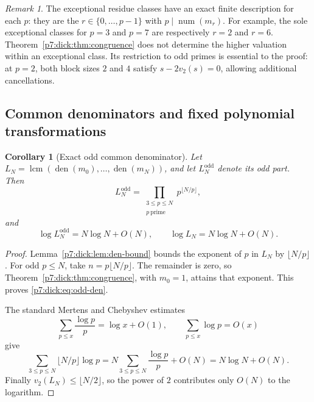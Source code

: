 \documentclass[11pt,a4paper]{article}
\newtheorem{corollary}[theorem]{Corollary}
\theoremstyle{definition}
\theoremstyle{remark}
\newtheorem{remark}[theorem]{Remark}
\DeclareMathOperator{\den}{den}
\DeclareMathOperator{\lcm}{lcm}
\numberwithin{equation}{section}
\begin{document}
\begin{remark}\label{p7:dick:rem:exceptions}
The exceptional residue classes have an exact finite description for each
$p$: they are the $r\in\{0,\ldots,p-1\}$ with
$p\mid\operatorname{num}(m_r)$.  For example, the sole exceptional classes
for $p=3$ and $p=7$ are respectively $r=2$ and $r=6$.
Theorem~\ref{p7:dick:thm:congruence} does not determine the higher valuation
within an exceptional class.  Its restriction to odd primes is essential
to the proof: at $p=2$, both block sizes $2$ and $4$ satisfy
$s-2v_2(s)=0$, allowing additional cancellations.
\end{remark}

\subsection{Common denominators and fixed polynomial transformations}

\begin{corollary}[Exact odd common denominator]\label{p7:dick:cor:common-den}
Let $L_N=\lcm(\den(m_0),\ldots,\den(m_N))$, and let $L_N^{\mathrm{odd}}$
denote its odd part.  Then
\begin{equation}\label{p7:dick:eq:odd-den}
 L_N^{\mathrm{odd}}=
 \prod_{\substack{3\le p\le N\\p\ \mathrm{prime}}}p^{\lfloor N/p\rfloor},
\end{equation}
and
\begin{equation}\label{p7:dick:eq:den-growth}
 \log L_N^{\mathrm{odd}}=N\log N+O(N),
 \qquad \log L_N=N\log N+O(N).
\end{equation}
\end{corollary}
\begin{proof}
Lemma~\ref{p7:dick:lem:den-bound} bounds the exponent of $p$ in $L_N$ by
$\lfloor N/p\rfloor$.  For odd $p\le N$, take
$n=p\lfloor N/p\rfloor$.  The remainder is zero, so
Theorem~\ref{p7:dick:thm:congruence}, with $m_0=1$, attains that exponent.
This proves \eqref{p7:dick:eq:odd-den}.

The standard Mertens and Chebyshev estimates
\[
 \sum_{p\le x}\frac{\log p}{p}=\log x+O(1),
 \qquad \sum_{p\le x}\log p=O(x)
\]
give
\[
 \sum_{3\le p\le N}\lfloor N/p\rfloor\log p
 =N\sum_{3\le p\le N}\frac{\log p}{p}+O(N)
 =N\log N+O(N).
\]
Finally $v_2(L_N)\le\lfloor N/2\rfloor$, so the power of $2$ contributes
only $O(N)$ to the logarithm.
\end{proof}
\end{document}
